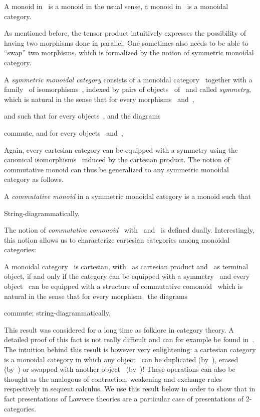 \documentclass{LMCS}
\begin{document}
\begin{exa}
  A monoid in~ is a monoid in the usual sense, a monoid
  in~ is a monoidal category.
\end{exa}

As mentioned before, the tensor product intuitively expresses the possibility of
having two morphisms done in parallel. One sometimes also needs to be able to
``swap'' two morphisms, which is formalized by the notion of symmetric monoidal
category.

\begin{defi}
  A \emph{symmetric monoidal category}  consists of a
  monoidal category~ together with a family~ of
  isomorphisms~, indexed by pairs of
  objects~ of~ and called \emph{symmetry}, which is natural in the
  sense that for every morphisms~ and~,
  
  and such that for every objects~,  and  the diagrams
  
  commute, and for every objects~ and~,
  
\end{defi}

Again, every cartesian category can be equipped with a symmetry using the
canonical isomorphisms~ induced by the cartesian product. The
notion of commutative monoid can thus be generalized to any symmetric monoidal
category as follows.

\begin{defi}
  A \emph{commutative monoid}  in a symmetric monoidal
  category  is a monoid such that
  
  String-diagrammatically,
  
\end{defi}

The notion of \emph{commutative comonoid}~
with~ and~ is defined
dually. Interestingly, this notion allows us to characterize cartesian
categories among monoidal categories:

\begin{prop}
  \label{prop:cart-comon}
  A monoidal category~ is cartesian, with~ as cartesian
  product and~ as terminal object, if and only if the category can be
  equipped with a symmetry~ and every object~ can be equipped with a
  structure of commutative comonoid~ which is
  natural in the sense that for every morphism~ the diagrams
  
  commute; string-diagrammatically,
  
\end{prop}

This result was considered for a long time as folklore in category theory. A
detailed proof of this fact is not really difficult and can for example be found
in~\cite{mellies:cat-sem-ll}. The intuition behind this result is however very
enlightening: a cartesian category is a monoidal category in which any
object~ can be duplicated (by~), erased
(by~) or swapped with another object~
(by~)! These operations can also be
thought as the analogous of contraction, weakening and exchange rules
respectively in sequent calculus. We use this result below in order to show that
in fact presentations of Lawvere theories are a particular case of presentations
of 2-categories.
\end{document}
